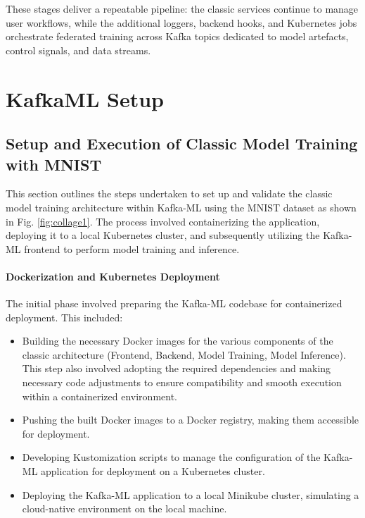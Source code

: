These stages deliver a repeatable pipeline: the classic services continue to manage user workflows, while the additional loggers, backend hooks, and Kubernetes jobs orchestrate federated training across Kafka topics dedicated to model artefacts, control signals, and data streams.

\section{KafkaML Setup}


\subsection{Setup and Execution of Classic Model Training with MNIST}
\label{subsec:classic_mnist_setup}

This section outlines the steps undertaken to set up and validate the classic model training architecture within Kafka-ML using the MNIST dataset as shown in Fig. \ref{fig:collage1}. The process involved containerizing the application, deploying it to a local Kubernetes cluster, and subsequently utilizing the Kafka-ML frontend to perform model training and inference.

\paragraph{Dockerization and Kubernetes Deployment}
The initial phase involved preparing the Kafka-ML codebase for containerized deployment. This included:
\begin{itemize}
    \item Building the necessary Docker images for the various components of the classic architecture (Frontend, Backend, Model Training, Model Inference). This step also involved adopting the required dependencies and making necessary code adjustments to ensure compatibility and smooth execution within a containerized environment.
    \item Pushing the built Docker images to a Docker registry, making them accessible for deployment.
    \item Developing Kustomization scripts to manage the configuration of the Kafka-ML application for deployment on a Kubernetes cluster.
    \item Deploying the Kafka-ML application to a local Minikube cluster, simulating a cloud-native environment on the local machine.
\end{itemize}


